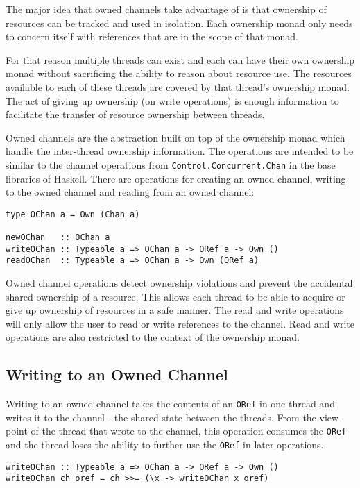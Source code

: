 \documentclass[onehalf,11pt]{beavtex}
\begin{document}
The major idea that owned channels take advantage of is that ownership
of resources can be tracked and used in isolation. Each ownership monad only
needs to concern itself with references that are in the scope of that monad.

For that reason multiple threads can exist and each can have their own
ownership monad without sacrificing the ability to reason about resource use.
The resources available to each of these threads are covered by that thread's
ownership monad.
The act of giving up ownership (on write operations) is enough information to
facilitate the transfer of resource ownership between threads.

Owned channels are the abstraction built on top of the ownership monad which
handle the inter-thread ownership information. The operations are intended
to be similar to the channel operations from \texttt{Control.Concurrent.Chan}
in the base libraries of Haskell. There are operations for creating an owned
channel, writing to the owned channel and reading from an owned channel:

\begin{verbatim}
type OChan a = Own (Chan a)

newOChan   :: OChan a
writeOChan :: Typeable a => OChan a -> ORef a -> Own ()
readOChan  :: Typeable a => OChan a -> Own (ORef a)
\end{verbatim}

Owned channel operations detect ownership violations and prevent the
accidental shared ownership of a resource.
This allows each thread to be able to acquire or give up ownership of resources
in a safe manner. The read and write operations will only allow the user to
read or write references to the channel. Read and write operations are also
restricted to the context of the ownership monad.

\subsection{Writing to an Owned Channel}

Writing to an owned channel takes the contents of an \texttt{ORef} in
one thread and writes it to the channel - the shared state between the threads.
From the view-point of the thread that wrote to the channel, this operation
consumes the \texttt{ORef} and the thread loses the ability to further use the
\texttt{ORef} in later operations.

\begin{verbatim}
writeOChan :: Typeable a => OChan a -> ORef a -> Own ()
writeOChan ch oref = ch >>= (\x -> writeOChan x oref)
\end{verbatim}
\end{document}
